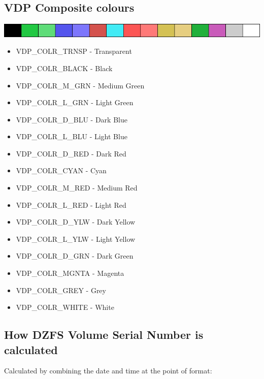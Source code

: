 \documentclass[a4paper,11pt]{article}
\begin{document}
    \subsection{VDP Composite colours}
    
    \includegraphics[scale=0.7]{TMS9918Apalette.png}

    \begin{itemize}
        \item VDP\_COLR\_TRNSP  - Transparent
        \item VDP\_COLR\_BLACK  - Black
        \item VDP\_COLR\_M\_GRN - Medium Green
        \item VDP\_COLR\_L\_GRN - Light Green
        \item VDP\_COLR\_D\_BLU - Dark Blue
        \item VDP\_COLR\_L\_BLU - Light Blue
        \item VDP\_COLR\_D\_RED - Dark Red
        \item VDP\_COLR\_CYAN   - Cyan
        \item VDP\_COLR\_M\_RED - Medium Red
        \item VDP\_COLR\_L\_RED - Light Red
        \item VDP\_COLR\_D\_YLW - Dark Yellow
        \item VDP\_COLR\_L\_YLW - Light Yellow
        \item VDP\_COLR\_D\_GRN - Dark Green
        \item VDP\_COLR\_MGNTA  - Magenta
        \item VDP\_COLR\_GREY   - Grey
        \item VDP\_COLR\_WHITE  - White
    \end{itemize}


    \subsection{How DZFS Volume Serial Number is calculated}
    Calculated by combining the date and time at the point of format:
\end{document}
